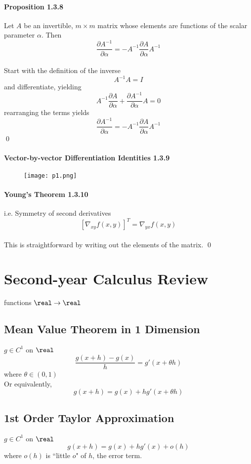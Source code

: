 \documentclass[11pt]{article}
\begin{document}
\paragraph{Proposition 1.3.8}
Let $A$ be an invertible, $m \times m$ matrix whose elements are functions of the scalar parameter $\alpha$. Then
$$\frac{\partial A^{-1}}{\partial \alpha} = -A^{-1}\frac{\partial A}{\partial \alpha} A^{-1}$$
 \\
Start with the definition of the inverse
$$A^{-1}A = I$$
and differentiate, yielding
$$A^{-1}\frac{\partial A}{\partial \alpha} + \frac{\partial A^{-1}}{\partial \alpha}A = 0$$
rearranging the terms yields
$$\frac{\partial A^{-1}}{\partial \alpha}  = -A^{-1}\frac{\partial A}{\partial \alpha}A^{-1}$$\qed

\paragraph{Vector-by-vector Differentiation Identities 1.3.9}
 \begin{figure}[h]
	\centering
	\texttt{[image: p1.png]}
\end{figure}

\paragraph{Young's Theorem 1.3.10}
i.e. Symmetry of second derivatives
$$[\nabla_{xy}f(x,y)]^T = \nabla_{yx}f(x,y)$$
 \\
This is straightforward by writing out the elements of the matrix. \qed


\section{Second-year Calculus Review}
functions $\real \rightarrow \real$
\subsection{Mean Value Theorem in 1 Dimension}
$g \in C^1$ on $\real$
$$\frac{g(x+h) - g(x)}{h} = g'(x + \theta h)$$
where $\theta \in (0,1)$ \\
Or equivalently,
$$g(x+h) = g(x) + hg'(x+\theta h)$$

\subsection{1st Order Taylor Approximation}
$g \in C^1$ on $\real$
$$g(x + h) = g(x) + hg'(x) + o(h)$$
where $o(h)$ is ``little $o$" of $h$, the error term.
\end{document}
